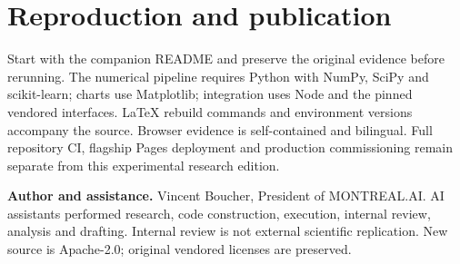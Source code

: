 \documentclass[10pt,letterpaper]{article}
\begin{document}
\section*{Reproduction and publication}
Start with the companion README and preserve the original evidence before rerunning. The numerical pipeline requires Python with NumPy, SciPy and scikit-learn; charts use Matplotlib; integration uses Node and the pinned vendored interfaces. LaTeX rebuild commands and environment versions accompany the source. Browser evidence is self-contained and bilingual. Full repository CI, flagship Pages deployment and production commissioning remain separate from this experimental research edition.

\textbf{Author and assistance.} Vincent Boucher, President of MONTREAL.AI. AI assistants performed research, code construction, execution, internal review, analysis and drafting. Internal review is not external scientific replication. New source is Apache-2.0; original vendored licenses are preserved.
\end{document}
